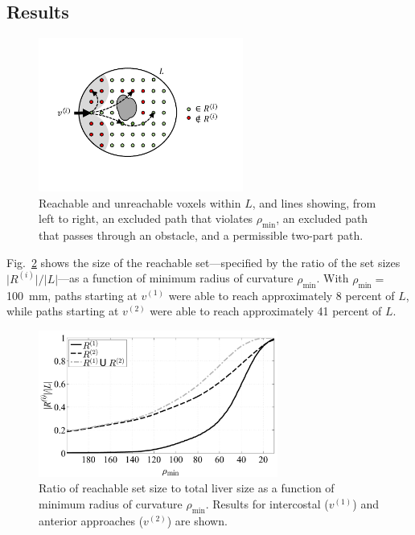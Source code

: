 \subsection{Results}
\begin{figure}[!t]
\centering
\includegraphics[width = 0.6\textwidth]{Images/Chapter3/Paths/Paths}%
\caption[Excluded and permissible paths]{Reachable and unreachable voxels within $L$, and lines showing, from left to right, an excluded path that violates $\rho_{\text{min}}$, an excluded path that passes through an obstacle, and a permissible two-part path. }
\label{fig:Paths}
\end{figure}

Fig.~\ref{fig:ReachableSizeByRho} shows the size of the reachable set---specified by the ratio of the set sizes $\lvert R^{(i)} \rvert / \lvert L \rvert$---as a function of minimum radius of curvature $\rho_{\text{min}}$. With $\rho_{\text{min}} =$ 100~mm, paths starting at $v^{(1)}$ were able to reach approximately 8 percent of $L$, while paths starting at $v^{(2)}$ were able to reach approximately 41 percent of $L$. 

\begin{figure}[!t]
\centering
\includegraphics[width = 0.7\textwidth]{Images/Chapter3/ReachableSizeByRho/ReachableSizeByRho}%
\caption[Reachable set size as a function of $\rho_{\text{min}}$]{Ratio of reachable set size to total liver size as a function of minimum radius of curvature $\rho_{\text{min}}$. Results for intercostal ($v^{(1)}$) and anterior approaches ($v^{(2)}$) are shown.}
\label{fig:ReachableSizeByRho}
\end{figure}

